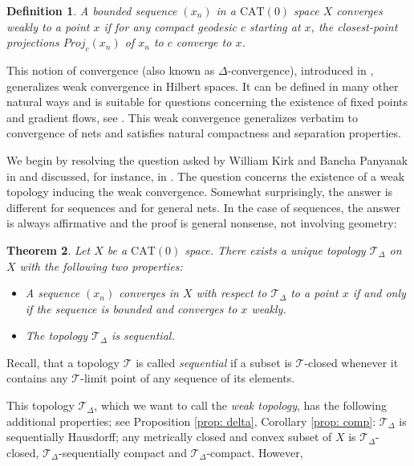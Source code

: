 \documentclass[12pt,leqno]{amsart}
\numberwithin{equation}{section}
\newtheorem{thm}{Theorem}[section]
\newtheorem{defn}[thm]{Definition}
\theoremstyle{remark}
\newcommand{\CAT}{\mathrm{CAT}}
\begin{document}
\begin{defn}
A bounded sequence $(x_n)$ in a $\CAT(0)$ space $X$ \emph{converges weakly} to a point $x$ if for any compact geodesic $c$ starting at $x$, the closest-point projections $Proj _c (x_n)$ of $x_n$ to $c$ converge to $x$. 
\end{defn}

This notion of convergence (also known as $\Delta$-convergence), introduced in \cite{Jost}, generalizes weak convergence in Hilbert spaces. It can be defined in many other natural ways and is suitable for questions concerning the existence of fixed points and gradient flows, see \cite{Bac}. This weak convergence generalizes verbatim to convergence of nets and satisfies natural compactness and separation properties.

We begin by resolving the question asked by William Kirk and Bancha Panyanak in \cite[Question 1]{Kirk} and discussed, for instance, in \cite{Bac4,Bac,Kell,Obs}.
The question concerns the existence of a weak topology inducing the weak convergence.
Somewhat surprisingly, the answer is different for sequences and for general nets.
In the case of sequences, the answer is always affirmative and the proof is general nonsense, not involving geometry:

\begin{thm} \label{thm1}
Let $X$ be a $\CAT(0)$ space. There exists a unique topology $\mathcal T_{\Delta }$ on $X$ with the following two properties:
\begin{itemize}

\item 	A sequence $(x_n)$ converges in $X$ with respect to $\mathcal T_{\Delta}$ to a point $x$ if and only if the sequence is bounded and converges to $x$ weakly. 

\item The topology $\mathcal T_{\Delta }$ is sequential.

\end{itemize}
\end{thm}

Recall, that a topology $\mathcal T$ is called \emph{sequential} if a subset is $\mathcal T$-closed whenever it contains any $\mathcal T$-limit point of any sequence of its elements. 

This topology $\mathcal T_{\Delta}$, which we want to call the \emph{weak topology}, has the following additional properties;
see Proposition \ref{prop: delta}, Corollary \ref{prop: comp}: 
$\mathcal T _{\Delta}$ is sequentially Hausdorff; any metrically closed and convex subset of $X$ is $\mathcal T_{\Delta}$-closed, 
	$\mathcal T_{\Delta}$-sequentially compact and $\mathcal T_{\Delta}$-compact. However,
\end{document}
